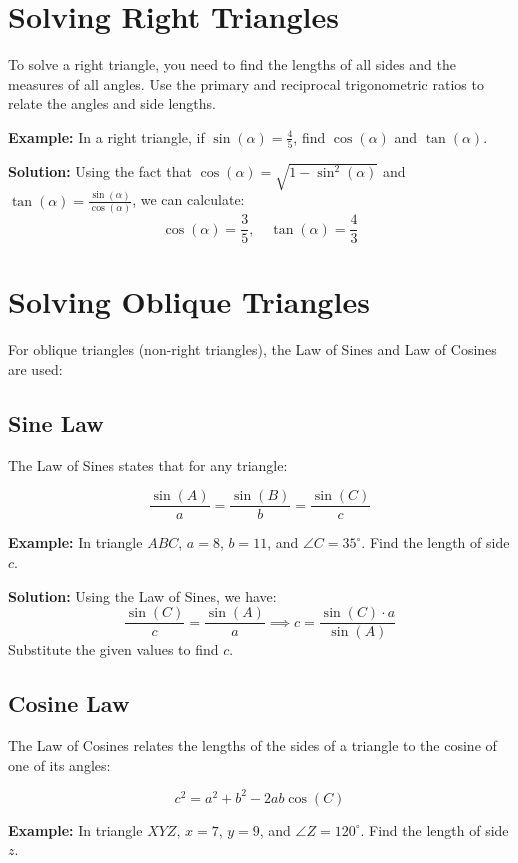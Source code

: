 \documentclass{article}
\begin{document}
\section{Solving Right Triangles}

To solve a right triangle, you need to find the lengths of all sides and the measures of all angles. Use the primary and reciprocal trigonometric ratios to relate the angles and side lengths.

\textbf{Example:} In a right triangle, if $\sin(\alpha) = \frac{4}{5}$, find $\cos(\alpha)$ and $\tan(\alpha)$.

\textbf{Solution:}
Using the fact that $\cos(\alpha) = \sqrt{1 - \sin^2(\alpha)}$ and $\tan(\alpha) = \frac{\sin(\alpha)}{\cos(\alpha)}$, we can calculate:
\[\cos(\alpha) = \frac{3}{5}, \quad \tan(\alpha) = \frac{4}{3}\]

\section{Solving Oblique Triangles}

For oblique triangles (non-right triangles), the Law of Sines and Law of Cosines are used:

\subsection{Sine Law}

The Law of Sines states that for any triangle:

\[\frac{\sin(A)}{a} = \frac{\sin(B)}{b} = \frac{\sin(C)}{c}\]

\textbf{Example:} In triangle $ABC$, $a = 8$, $b = 11$, and $\angle C = 35^\circ$. Find the length of side $c$.

\textbf{Solution:}
Using the Law of Sines, we have:
\[\frac{\sin(C)}{c} = \frac{\sin(A)}{a} \implies c = \frac{\sin(C) \cdot a}{\sin(A)}\]
Substitute the given values to find $c$.

\subsection{Cosine Law}

The Law of Cosines relates the lengths of the sides of a triangle to the cosine of one of its angles:

\[c^2 = a^2 + b^2 - 2ab\cos(C)\]

\textbf{Example:} In triangle $XYZ$, $x = 7$, $y = 9$, and $\angle Z = 120^\circ$. Find the length of side $z$.
\end{document}
